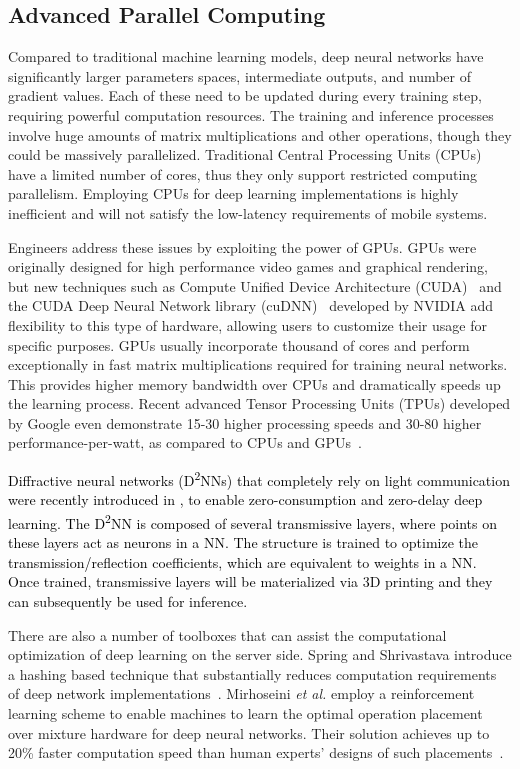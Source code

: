 \documentclass[journal,comsoc,letter]{IEEEtran}
\newcommand{\edit}[1]{\textcolor{black}{#1}}
\begin{document}
\subsection{Advanced Parallel Computing}
Compared to traditional machine learning models, deep neural networks have significantly larger parameters spaces, intermediate outputs, and number of gradient values. Each of these need to be updated during every training step, requiring powerful computation resources. The training and inference processes involve huge amounts of matrix multiplications and other operations, though they could be massively parallelized. Traditional Central Processing Units (CPUs) have a limited number of cores, thus they only support restricted computing parallelism. Employing CPUs for deep learning implementations is highly inefficient and will not satisfy the low-latency requirements of mobile systems. 

Engineers address these issues by exploiting the power of GPUs. GPUs were originally designed for high performance video games and graphical rendering, but new techniques such as Compute Unified Device Architecture (CUDA)~\cite{nickolls2008scalable} and the CUDA Deep Neural Network library (cuDNN)~\cite{chetlur2014cudnn} developed by NVIDIA add flexibility to this type of hardware, allowing users to customize their usage for specific purposes. GPUs usually incorporate thousand of cores and perform exceptionally in fast matrix multiplications required for training neural networks. This provides higher memory bandwidth over CPUs and dramatically speeds up the learning process. Recent advanced Tensor Processing Units (TPUs) developed by Google even demonstrate 15-30 higher processing speeds and 30-80 higher performance-per-watt, as compared to CPUs and GPUs~\cite{jouppi2017datacenter}. 

\edit{Diffractive neural networks (D\textsuperscript{2}NNs) that completely rely on light communication were recently introduced in \cite{Lineaat8084}, to enable zero-consumption and zero-delay deep learning. The D\textsuperscript{2}NN is composed of several transmissive layers, where points on these layers act as neurons in a NN. The structure is trained to optimize the transmission/reflection coefficients, which are equivalent to weights in a NN. Once trained, transmissive layers will be materialized via 3D printing and they can subsequently be used for inference.}

There are also a number of toolboxes that can assist the computational optimization of deep learning on the server side. Spring and Shrivastava introduce a hashing based technique that substantially reduces computation requirements of deep network implementations~\cite{spring2017scalable}. Mirhoseini \emph{et al.} employ a reinforcement learning scheme to enable machines to learn the optimal operation placement over mixture hardware for deep neural networks.  Their solution achieves up to 20\% faster computation speed than human experts' designs of such placements~\cite{mirhoseini2017device}.
\end{document}
